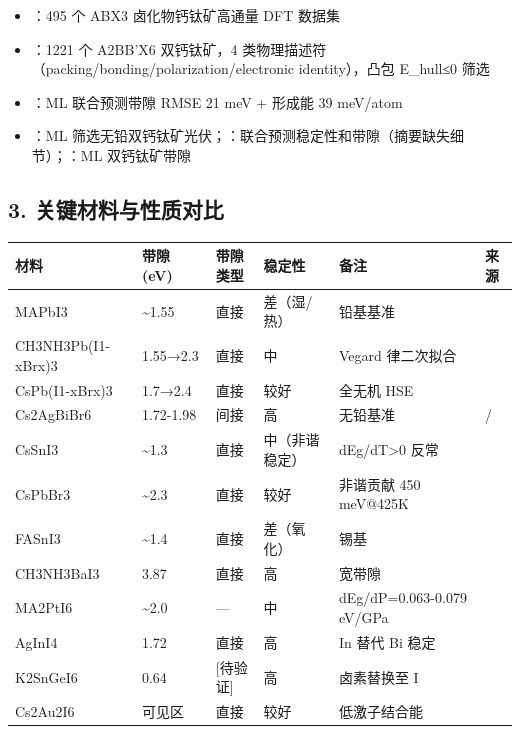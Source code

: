 \documentclass[12pt,a4paper]{ctexart}
\providecommand{\tightlist}{%
  \setlength{\itemsep}{0pt}\setlength{\parskip}{0pt}}
\begin{document}
\begin{itemize}
\tightlist
\item
  \textbf{\cite{p53}}：495 个 ABX3 卤化物钙钛矿高通量 DFT 数据集
\item
  \textbf{\cite{p65}}：1221 个 A2BB'X6 双钙钛矿，4 类物理描述符（packing/bonding/polarization/electronic identity），凸包 E\_hull≤0 筛选
\item
  \textbf{\cite{p60}}：ML 联合预测带隙 RMSE 21 meV + 形成能 39 meV/atom
\item
  \textbf{\cite{p64}}：ML 筛选无铅双钙钛矿光伏；\textbf{\cite{p19}}：联合预测稳定性和带隙（摘要缺失细节）；\textbf{\cite{p41}}：ML 双钙钛矿带隙
\end{itemize}

\subsection{3. 关键材料与性质对比}\label{ux5173ux952eux6750ux6599ux4e0eux6027ux8d28ux5bf9ux6bd4}

{\def\LTcaptype{none} %
\begin{longtable}[]{@{}llllll@{}}
\toprule\noalign{}
材料 & 带隙 (eV) & 带隙类型 & 稳定性 & 备注 & 来源 \\
\midrule\noalign{}
\endhead
\bottomrule\noalign{}
\endlastfoot
MAPbI3 & \textasciitilde1.55 & 直接 & 差（湿/热） & 铅基基准 & \cite{p2} \\
CH3NH3Pb(I1-xBrx)3 & 1.55→2.3 & 直接 & 中 & Vegard 律二次拟合 & \cite{p13} \\
CsPb(I1-xBrx)3 & 1.7→2.4 & 直接 & 较好 & 全无机 HSE & \cite{p4} \\
Cs2AgBiBr6 & 1.72-1.98 & 间接 & 高 & 无铅基准 & \cite{p14}/\cite{p17} \\
CsSnI3 & \textasciitilde1.3 & 直接 & 中（非谐稳定） & dEg/dT\textgreater0 反常 & \cite{p36} \\
CsPbBr3 & \textasciitilde2.3 & 直接 & 较好 & 非谐贡献 450 meV@425K & \cite{p38} \\
FASnI3 & \textasciitilde1.4 & 直接 & 差（氧化） & 锡基 & \cite{p34} \\
CH3NH3BaI3 & 3.87 & 直接 & 高 & 宽带隙 & \cite{p7} \\
MA2PtI6 & \textasciitilde2.0 & --- & 中 & dEg/dP=0.063-0.079 eV/GPa & \cite{p20} \\
AgInI4 & 1.72 & 直接 & 高 & In 替代 Bi 稳定 & \cite{p70} \\
K2SnGeI6 & 0.64 & {[}待验证{]} & 高 & 卤素替换至 I & \cite{p66} \\
Cs2Au2I6 & 可见区 & 直接 & 较好 & 低激子结合能 & \cite{p67} \\
\end{longtable}
}
\end{document}
